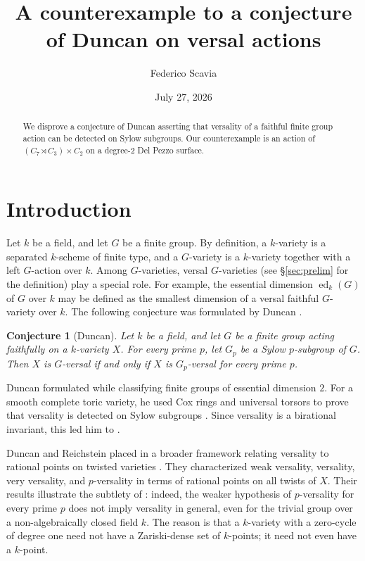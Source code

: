 \documentclass{amsart}
\title[A counterexample to Duncan's conjecture]{A counterexample to a conjecture of Duncan on versal actions}
\author{Federico Scavia}
\date{July 27, 2026}
\newtheorem{conj}[conj]{Conjecture}
\theoremstyle{definition}
\theoremstyle{remark}
\numberwithin{equation}{section}
\newcommand{\ed}{\operatorname{ed}}
\begin{document}
\pagestyle{headings}


\begin{abstract}
We disprove a conjecture of Duncan asserting that versality of a faithful
finite group action can be detected on Sylow subgroups. Our counterexample
is an action of $(C_7\rtimes C_3)\times C_2$ on a degree-$2$ Del Pezzo surface.
\end{abstract}

\vspace*{-0.5cm}
\maketitle



\section{Introduction}

Let $k$ be a field, and let $G$ be a finite group. By definition, a $k$-variety is a separated $k$-scheme of finite type, and a $G$-variety is a $k$-variety together with a left $G$-action over $k$. Among $G$-varieties, versal $G$-varieties (see \S\ref{sec:prelim} for the definition) play a special role. For example, the essential dimension $\ed_k(G)$ of $G$ over $k$ may be defined as the smallest dimension of a versal faithful $G$-variety over $k$. The following conjecture was formulated by Duncan \cite{Duncan-ed2}. 

\begin{conj}[Duncan]\label{conj:duncan}
Let $k$ be a field, and let $G$ be a finite group acting faithfully on a $k$-variety $X$. For every prime $p$, let $G_p$ be a Sylow $p$-subgroup of $G$. Then $X$ is $G$-versal
if and only if $X$ is $G_p$-versal for every prime $p$.
\end{conj}

Duncan formulated  while classifying finite
groups of essential dimension $2$. For a smooth complete toric variety, he
used Cox rings and universal torsors to prove that versality is detected on
Sylow subgroups \cite[Corollary~3.6]{Duncan-ed2}. Since versality is a
birational invariant, this led him to .

Duncan and Reichstein placed  in a broader
framework relating versality to rational points on twisted varieties
\cite{Duncan-Reichstein}. They characterized weak versality, versality, very versality, and $p$-versality in terms of rational points on all twists of $X$. Their results illustrate the subtlety of : indeed, the weaker hypothesis of $p$-versality for every prime $p$ does not imply versality in general, even for the trivial group over a non-algebraically closed field $k$. The reason is that a $k$-variety with a zero-cycle of degree one need not have a Zariski-dense set of $k$-points; it need not even have a $k$-point.
\end{document}
